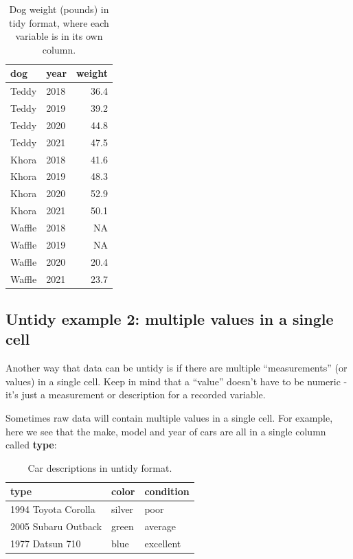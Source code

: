 \documentclass[
]{book}
\begin{document}
\begin{table}

\caption{\label{tab:unnamed-chunk-4}Dog weight (pounds) in tidy format, where each variable is in its own column.}
\centering
\begin{tabular}[t]{l|l|r}
\hline
dog & year & weight\\
\hline
Teddy & 2018 & 36.4\\
\hline
Teddy & 2019 & 39.2\\
\hline
Teddy & 2020 & 44.8\\
\hline
Teddy & 2021 & 47.5\\
\hline
Khora & 2018 & 41.6\\
\hline
Khora & 2019 & 48.3\\
\hline
Khora & 2020 & 52.9\\
\hline
Khora & 2021 & 50.1\\
\hline
Waffle & 2018 & NA\\
\hline
Waffle & 2019 & NA\\
\hline
Waffle & 2020 & 20.4\\
\hline
Waffle & 2021 & 23.7\\
\hline
\end{tabular}
\end{table}

\hypertarget{untidy-example-2-multiple-values-in-a-single-cell}{%
\subsection{Untidy example 2: multiple values in a single cell}\label{untidy-example-2-multiple-values-in-a-single-cell}}

Another way that data can be untidy is if there are multiple ``measurements'' (or values) in a single cell. Keep in mind that a ``value'' doesn't have to be numeric - it's just a measurement or description for a recorded variable.

Sometimes raw data will contain multiple values in a single cell. For example, here we see that the make, model and year of cars are all in a single column called \textbf{type}:

\begin{table}

\caption{\label{tab:unnamed-chunk-5}Car descriptions in untidy format.}
\centering
\begin{tabular}[t]{l|l|l}
\hline
type & color & condition\\
\hline
1994 Toyota Corolla & silver & poor\\
\hline
2005 Subaru Outback & green & average\\
\hline
1977 Datsun 710 & blue & excellent\\
\hline
\end{tabular}
\end{table}
\end{document}
